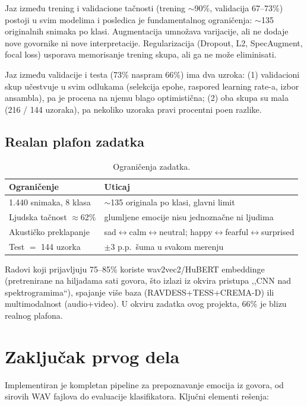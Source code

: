 \documentclass[12pt,a4paper]{article}
\begin{document}
Jaz između trening i validacione tačnosti (trening $\sim$90\%, validacija
67--73\%) postoji u svim modelima i posledica je fundamentalnog
ograničenja: $\sim$135 originalnih snimaka po klasi. Augmentacija umnožava
varijacije, ali ne dodaje nove govornike ni nove interpretacije.
Regularizacija (Dropout, L2, SpecAugment, focal loss) usporava memorisanje
trening skupa, ali ga ne može eliminisati.

Jaz između validacije i testa (73\% naspram 66\%) ima dva uzroka: (1)
validacioni skup učestvuje u svim odlukama (selekcija epohe, raspored
learning rate-a, izbor ansambla), pa je procena na njemu blago
optimistična; (2) oba skupa su mala (216 / 144 uzoraka), pa nekoliko
uzoraka pravi procentni poen razlike.

\subsection{Realan plafon zadatka}

\begin{table}[H]
\centering
\begin{tabular}{ll}
\toprule
Ograničenje & Uticaj \\
\midrule
1.440 snimaka, 8 klasa & $\sim$135 originala po klasi, glavni limit \\
Ljudska tačnost $\approx$62\% & glumljene emocije nisu jednoznačne ni ljudima \\
Akustičko preklapanje & sad$\leftrightarrow$calm$\leftrightarrow$neutral;
                        happy$\leftrightarrow$fearful$\leftrightarrow$surprised \\
Test $=$ 144 uzorka & $\pm$3 p.p.\ šuma u svakom merenju \\
\bottomrule
\end{tabular}
\caption{Ograničenja zadatka.}
\end{table}

Radovi koji prijavljuju 75--85\% koriste wav2vec2/HuBERT embeddinge
(pretrenirane na hiljadama sati govora, što izlazi iz okvira pristupa
,,CNN nad spektrogramima``), spajanje više baza (RAVDESS+TESS+CREMA-D) ili
multimodalnost (audio+video). U okviru zadatka ovog projekta, 66\% je
blizu realnog plafona.

\section{Zaključak prvog dela}

Implementiran je kompletan pipeline za prepoznavanje emocija iz govora, od
sirovih WAV fajlova do evaluacije klasifikatora. Ključni elementi rešenja:
\end{document}
